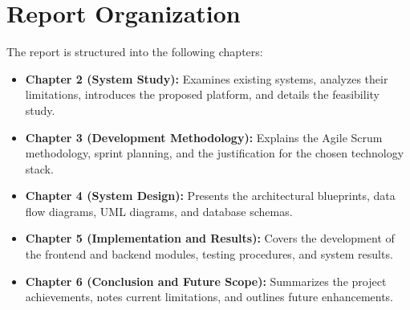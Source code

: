 \section{Report Organization}

The report is structured into the following chapters:

\begin{itemize}
    \item \textbf{Chapter 2 (System Study):} Examines existing systems, analyzes their limitations, introduces the proposed platform, and details the feasibility study.
    \item \textbf{Chapter 3 (Development Methodology):} Explains the Agile Scrum methodology, sprint planning, and the justification for the chosen technology stack.
    \item \textbf{Chapter 4 (System Design):} Presents the architectural blueprints, data flow diagrams, UML diagrams, and database schemas.
    \item \textbf{Chapter 5 (Implementation and Results):} Covers the development of the frontend and backend modules, testing procedures, and system results.
    \item \textbf{Chapter 6 (Conclusion and Future Scope):} Summarizes the project achievements, notes current limitations, and outlines future enhancements.
\end{itemize}
